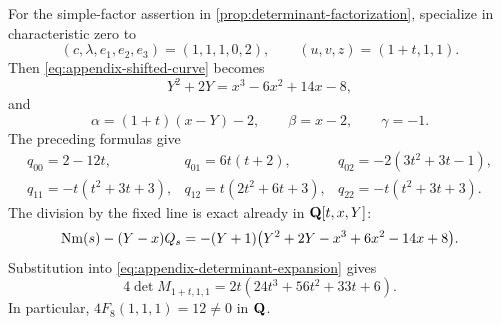 For the simple-factor assertion in
\cref{prop:determinant-factorization}, specialize in characteristic zero to
\[
 (c,\lambda,e_1,e_2,e_3)=(1,1,1,0,2),
 \qquad (u,v,z)=(1+t,1,1).
\]
Then \eqref{eq:appendix-shifted-curve} becomes
\[
 Y^2+2Y=x^3-6x^2+14x-8,
\]
and
\[
 \alpha=(1+t)(x-Y)-2,\qquad \beta=x-2,\qquad \gamma=-1.
\]
The preceding formulas give
\[
\begin{array}{lll}
q_{00}=2-12t,&q_{01}=6t(t+2),&q_{02}=-2(3t^2+3t-1),\\
q_{11}=-t(t^2+3t+3),&q_{12}=t(2t^2+6t+3),&
q_{22}=-t(t^2+3t+3).
\end{array}
\]
The division by the fixed line is exact already in $\mathbf Q[t,x,Y]$:
\begin{align*}
 \operatorname{Nm}(s)-(Y-x)Q_s
  =-(Y+1)\bigl(Y^2+2Y-x^3+6x^2-14x+8\bigr).
\end{align*}
Substitution into \eqref{eq:appendix-determinant-expansion} gives
\begin{equation}
 4\det M_{1+t,1,1}=2t(24t^3+56t^2+33t+6).
\label{eq:appendix-simple-structural-factor}
\end{equation}
In particular, $4F_8(1,1,1)=12\ne0$ in $\mathbf Q$.

